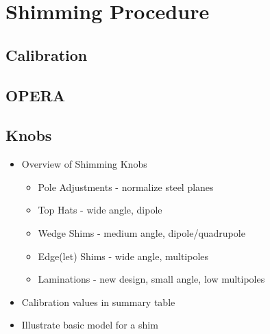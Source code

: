 \section{Shimming Procedure} \label{sec:Shimming-Procedure}


\subsection{Calibration}

\subsection{OPERA}

\subsection{Knobs}

\begin{itemize}
  \item Overview of Shimming Knobs
    \begin{itemize}
      \item Pole Adjustments - normalize steel planes      
      \item Top Hats - wide angle, dipole
      \item Wedge Shims - medium angle, dipole/quadrupole
      \item Edge(let) Shims - wide angle, multipoles
      \item Laminations - new design, small angle, low multipoles
    \end{itemize}
  \item Calibration values in summary table
  \item Illustrate basic model for a shim
\end{itemize}

